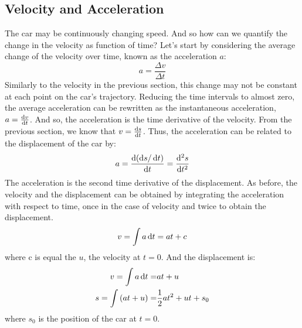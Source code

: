 \subsection{Velocity and Acceleration}
The car may be continuously changing speed. And so how can we quantify the change in the velocity as function of time? Let's start by considering the average change of the velocity over time, known as the acceleration $a$:
\begin{equation}
a = \frac{\Delta v}{\Delta t} 
\end{equation}
\nl
Similarly to the velocity in the previous section, this change may not be constant at each point on the car's trajectory. Reducing the time intervals to almost zero, the average acceleration can be rewritten as the instantaneous acceleration, $a = \frac{\operatorname{d}\! v}{\operatorname{d}\! t}$. And so, the acceleration is the time derivative of the velocity. From the previous section, we know that $v = \frac{\operatorname{d}\! s}{\operatorname{d}\! t}$. Thus, the acceleration can be related to the displacement of the car by:
 \begin{equation}
a = \frac{\operatorname{d}\! \left(\operatorname{d}\! s/ \operatorname{d}\! t\right)}{\operatorname{d}\! t} = \frac{\operatorname{d}\!^2 s}{\operatorname{d}\! t^2} 
\end{equation}
 The acceleration is the second time derivative of the displacement. 
\nll
{}
\nl
As before, the velocity and the displacement can be obtained by integrating the acceleration with respect to time, once in the case of velocity and twice to obtain the displacement.
  \begin{equation}
v = \int a \operatorname{d}\! t = at + c
\label{vel}
\end{equation}
where c is equal the $u$, the velocity at $t=0$. And the displacement is:
 \begin{eqnarray}
v = \int a \operatorname{d}\! t =& at + u\\
s = \int \left(at + u\right) =& \frac{1}{2} a t^2 + u t + s_0
\label{s}
\end{eqnarray}
where $s_0$ is the position of the car at $t=0$. 

